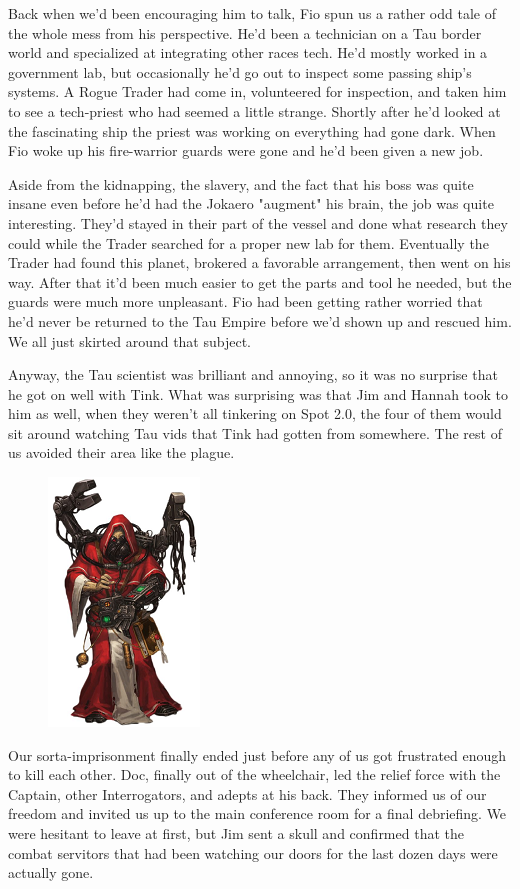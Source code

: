 Back when we'd been encouraging him to talk, Fio spun us a rather odd tale of the whole mess from his perspective. 
He'd been a technician on a Tau border world and specialized at integrating other races tech. 
He'd mostly worked in a government lab, but occasionally he'd go out to inspect some passing ship's systems. 
A Rogue Trader had come in, volunteered for inspection, and taken him to see a tech-priest who had seemed a little strange. 
Shortly after he'd looked at the fascinating ship the priest was working on everything had gone dark. 
When Fio woke up his fire-warrior guards were gone and he'd been given a new job.

Aside from the kidnapping, the slavery, and the fact that his boss was quite insane even before he'd had the Jokaero "augment" his brain, the job was quite interesting. 
They'd stayed in their part of the vessel and done what research they could while the Trader searched for a proper new lab for them. 
Eventually the Trader had found this planet, brokered a favorable arrangement, then went on his way. 
After that it'd been much easier to get the parts and tool he needed, but the guards were much more unpleasant. 
Fio had been getting rather worried that he'd never be returned to the Tau Empire before we'd shown up and rescued him. 
We all just skirted around that subject.

Anyway, the Tau scientist was brilliant and annoying, so it was no surprise that he got on well with Tink. 
What was surprising was that Jim and Hannah took to him as well, when they weren't all tinkering on Spot 2.0, the four of them would sit around watching Tau vids that Tink had gotten from somewhere. 
The rest of us avoided their area like the plague.

\begin{figure}
	\begin{center}
		\includegraphics[width=\figwidth]{pics/11/99.png}
	\end{center}
\end{figure}
Our sorta-imprisonment finally ended just before any of us got frustrated enough to kill each other. 
Doc, finally out of the wheelchair, led the relief force with the Captain, other Interrogators, and adepts at his back. 
They informed us of our freedom and invited us up to the main conference room for a final debriefing. 
We were hesitant to leave at first, but Jim sent a skull and confirmed that the combat servitors that had been watching our doors for the last dozen days were actually gone.

